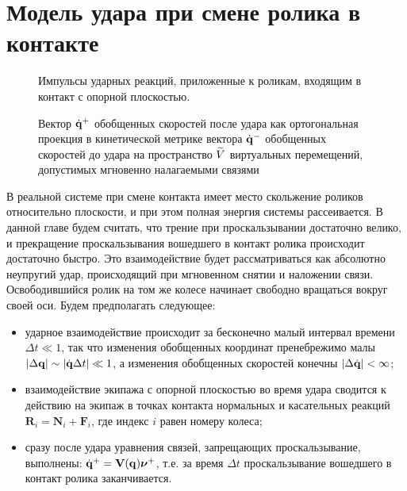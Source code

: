 \section{Модель удара при смене ролика в контакте}

\begin{center}
    \begin{figure}[ht]
            \centering
            \caption{Импульсы ударных реакций, приложенные к роликам, входящим в контакт с опорной плоскостью.}
            \label{fig:react}
        \endminipage
        \qquad
            \centering
            \caption{Вектор $\dot{\mathbf{q}}^+$ обобщенных скоростей после удара как ортогональная проекция в кинетической метрике вектора $\dot{\mathbf{q}}^-$ обобщенных скоростей до удара на пространство $\widetilde{V}$ виртуальных перемещений, допустимых мгновенно налагаемыми связями}
            \label{fig:project}
        \endminipage
    \end{figure}
\end{center}

В реальной системе при смене контакта имеет место скольжение роликов относительно плоскости, и при этом полная энергия системы рассеивается. В данной главе будем считать, что трение при проскальзывании достаточно велико, и прекращение проскальзывания вошедшего в контакт ролика происходит достаточно быстро. Это взаимодействие будет рассматриваться как абсолютно неупругий удар, происходящий при мгновенном снятии и наложении связи. Освободившийся ролик на том же колесе начинает свободно вращаться вокруг своей оси.
Будем предполагать следующее:
\begin{itemize}
    \item ударное взаимодействие происходит за бесконечно малый интервал времени $\Delta t \ll 1$, так что изменения обобщенных координат пренебрежимо малы $|\Delta \mathbf{q}| \sim |\dot{\mathbf{q}}\Delta t| \ll 1$, а изменения обобщенных скоростей конечны $|\Delta \dot{\mathbf{q}}| < \infty$;
    \item взаимодействие экипажа с опорной плоскостью во время удара сводится к действию на экипаж в точках контакта нормальных и касательных реакций $\mathbf{R}_i = \mathbf{N}_i + \mathbf{F}_i$, где индекс $i$ равен номеру колеса;
    \item сразу после удара 
    уравнения связей, запрещающих проскальзывание, выполнены: $\dot{\mathbf{q}}^+ = \mathbf{V}(\mathbf{q})\boldsymbol{\mathbf{\nu}}^+$, т.е. за время $\Delta t$ проскальзывание вошедшего в контакт ролика заканчивается.
\end{itemize}

